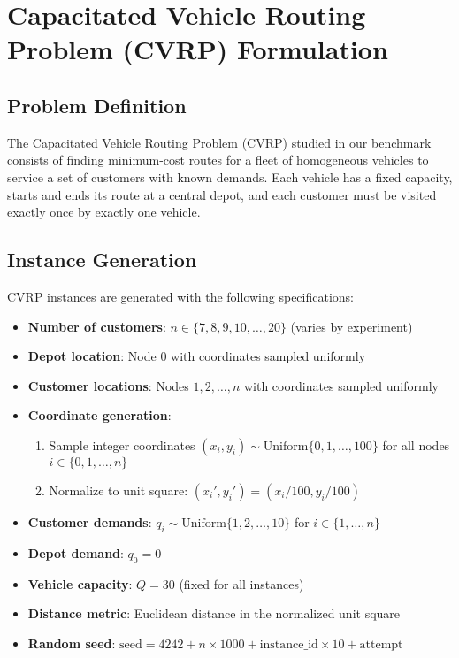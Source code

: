 \documentclass[11pt]{article}
\begin{document}
\section{Capacitated Vehicle Routing Problem (CVRP) Formulation}

\subsection{Problem Definition}

The Capacitated Vehicle Routing Problem (CVRP) studied in our benchmark consists of finding minimum-cost routes for a fleet of homogeneous vehicles to service a set of customers with known demands. Each vehicle has a fixed capacity, starts and ends its route at a central depot, and each customer must be visited exactly once by exactly one vehicle.

\subsection{Instance Generation}

CVRP instances are generated with the following specifications:

\begin{itemize}
    \item \textbf{Number of customers}: $n \in \{7, 8, 9, 10, \ldots, 20\}$ (varies by experiment)
    \item \textbf{Depot location}: Node $0$ with coordinates sampled uniformly
    \item \textbf{Customer locations}: Nodes $1, 2, \ldots, n$ with coordinates sampled uniformly
    \item \textbf{Coordinate generation}: 
        \begin{enumerate}
            \item Sample integer coordinates $(x_i, y_i) \sim \text{Uniform}\{0, 1, \ldots, 100\}$ for all nodes $i \in \{0, 1, \ldots, n\}$
            \item Normalize to unit square: $(x_i', y_i') = (x_i/100, y_i/100)$
        \end{enumerate}
    \item \textbf{Customer demands}: $q_i \sim \text{Uniform}\{1, 2, \ldots, 10\}$ for $i \in \{1, \ldots, n\}$
    \item \textbf{Depot demand}: $q_0 = 0$
    \item \textbf{Vehicle capacity}: $Q = 30$ (fixed for all instances)
    \item \textbf{Distance metric}: Euclidean distance in the normalized unit square
    \item \textbf{Random seed}: $\text{seed} = 4242 + n \times 1000 + \text{instance\_id} \times 10 + \text{attempt}$
\end{itemize}
\end{document}
